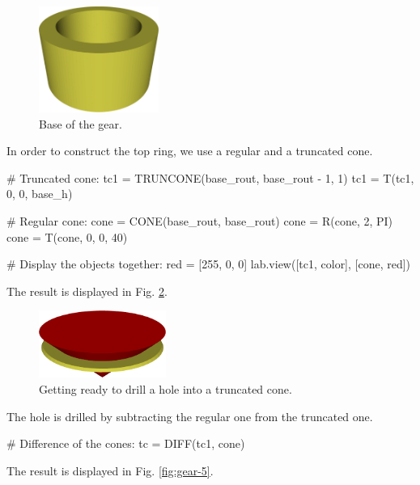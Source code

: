 \begin{figure}[!ht]
\begin{center}
\includegraphics[width=0.35\textwidth]{img/gear-3.png}
\end{center}
\vspace{-4mm}
\caption{Base of the gear.}
\label{fig:gear-3}
\end{figure}
\noindent
In order to construct the top ring, we use a regular and a truncated cone.

{\small
\begin{bluecode}
# Truncated cone:
tc1 = TRUNCONE(base_rout, base_rout - 1, 1)
tc1 = T(tc1, 0, 0, base_h)

# Regular cone:
cone = CONE(base_rout, base_rout)
cone = R(cone, 2, PI)
cone = T(cone, 0, 0, 40)

# Display the objects together:
red = [255, 0, 0]
lab.view([tc1, color], [cone, red])
\end{bluecode}
}
\noindent
The result is displayed in Fig. \ref{fig:gear-4}.


\begin{figure}[!ht]
\begin{center}
\includegraphics[width=0.37\textwidth]{img/gear-4.png}
\end{center}
\vspace{-4mm}
\caption{Getting ready to drill a hole into a truncated cone.}
\label{fig:gear-4}
\end{figure}
\noindent
\noindent
The hole is drilled by subtracting the regular one from the truncated one.

{\small
\begin{bluecode}
# Difference of the cones:
tc = DIFF(tc1, cone)
\end{bluecode}
}
\noindent
The result is displayed in Fig. \ref{fig:gear-5}.


